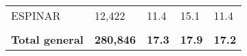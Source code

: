 \begin{tabular}{lllll}
	\cellcolor[HTML]{FF5050}ESPINAR                                & 12,422                                                                & 11.4                                                                             & 15.1                                                                        & 11.4                                                                                \\
	&                                                                       &                                                                                  &                                                                             &                                                                                     \\
	\rowcolor[HTML]{DDEBF7} 
	\textbf{Total   general}                                       & \textbf{280,846}                                                      & \textbf{17.3}                                                                    & \textbf{17.9}                                                               & \textbf{17.2}                                                                      
\end{tabular}
